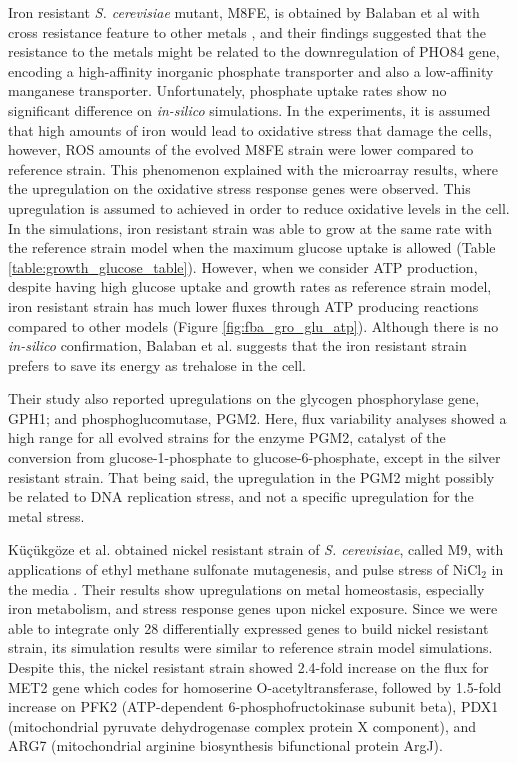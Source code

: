 Iron resistant \emph{S. cerevisiae} mutant, M8FE, is obtained by Balaban et al with cross resistance feature to other metals \cite{balaban2020evolutionary}, and their findings suggested that the resistance to the metals might be related to the downregulation of PHO84 gene, encoding a high-affinity inorganic phosphate transporter and also a low-affinity manganese transporter. Unfortunately, phosphate uptake rates show no significant difference on \emph{in-silico} simulations. In the experiments, it is assumed that high amounts of iron would lead to oxidative stress that damage the cells, however, ROS amounts of the evolved M8FE strain were lower compared to reference strain. This phenomenon explained with the microarray results, where the upregulation on the oxidative stress response genes were observed. This upregulation is assumed to achieved in order to reduce oxidative levels in the cell. In the simulations, iron resistant strain was able to grow at the same rate with the reference strain model when the maximum glucose uptake is allowed (Table \ref{table:growth_glucose_table}). However, when we consider ATP production, despite having high glucose uptake and growth rates as reference strain model, iron resistant strain has much lower fluxes through ATP producing reactions compared to other models (Figure \ref{fig:fba_gro_glu_atp}). Although there is no \emph{in-silico} confirmation, Balaban et al. suggests that the iron resistant strain prefers to save its energy as trehalose in the cell.

Their study also reported upregulations on the glycogen phosphorylase gene, GPH1; and phosphoglucomutase, PGM2. Here, flux variability analyses showed a high range for all evolved strains for the enzyme PGM2, catalyst of the conversion from glucose-1-phosphate to glucose-6-phosphate, except in the silver resistant strain. That being said, the upregulation in the PGM2 might possibly be related to DNA replication stress, and not a specific upregulation for the metal stress.

Küçükgöze et al. obtained nickel resistant strain of \emph{S. cerevisiae}, called M9, with applications of ethyl methane sulfonate mutagenesis, and pulse stress of NiCl$_2$ in the media \cite{kuccukgoze2013evolutionary}. Their results show upregulations on metal homeostasis, especially iron metabolism, and stress response genes upon nickel exposure. Since we were able to integrate only 28 differentially expressed genes to build nickel resistant strain, its simulation results were similar to reference strain model simulations. Despite this, the nickel resistant strain showed 2.4-fold increase on the flux for MET2 gene which codes for homoserine O-acetyltransferase, followed by 1.5-fold increase on PFK2 (ATP-dependent 6-phosphofructokinase subunit beta), PDX1 (mitochondrial pyruvate dehydrogenase complex protein X component), and ARG7 (mitochondrial arginine biosynthesis bifunctional protein ArgJ).

